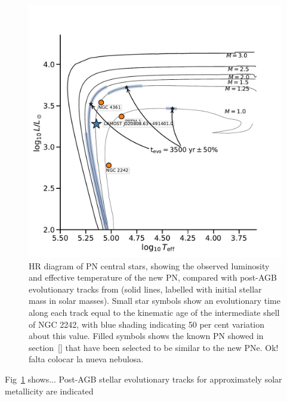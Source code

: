 \documentclass[twocolumn]{article}
\begin{document}
\begin{figure}
\centering
  \includegraphics[width=\linewidth]{../track-ev/hr-planetarieNebula}
  \caption{HR diagram of PN central stars, showing the observed luminosity
and effective temperature of the new PN, compared with
post-AGB evolutionary tracks from \citet{Miller:2016} (solid lines,
labelled with initial stellar mass in solar masses). Small star symbols show
an evolutionary time along each track equal to the kinematic age of the
intermediate shell of NGC 2242, with blue shading indicating 50 per cent
variation about this value.  Filled symbols shows the known PN showed in section~\ref{}
that have been selected to be  similar to the new PNe. {\sc Ok! falta colocar la nueva nebulosa}.} 
  \label{fig:track-evolutive}
\end{figure}

Fig~\ref{fig:track-evolutive} shows... Post-AGB stellar evolutionary tracks for
approximately solar metallicity \citep{Miller:2016} are indicated


\end{document}
